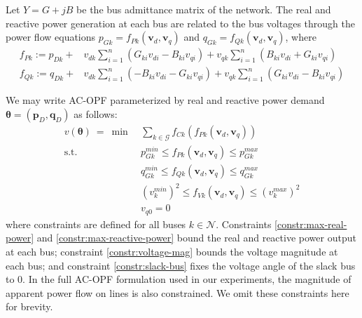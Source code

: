 \documentclass[10pt]{article} %
\theoremstyle{plain}
\theoremstyle{definition}
\theoremstyle{remark}
\begin{document}
Let $Y = G + j B$ be the bus admittance matrix of the network.
The real and reactive power generation at each bus are related to the bus voltages through the power flow equations $p_{Gk} = f_{Pk}(\mathbf{v}_d, \mathbf{v}_q)$ and $q_{Gk} = f_{Qk}(\mathbf{v}_d, \mathbf{v}_q)$, where
{
\setlength{\abovedisplayskip}{1pt}
\setlength{\belowdisplayskip}{3pt}
\setlength{\jot}{0pt}
\setlength{\arraycolsep}{3pt}
\begin{align}
    f_{Pk} :=  p_{Dk} + &v_{dk} \sum_{i=1}^{n}(G_{ki} v_{di} - B_{ki} v_{qi})
    + v_{qk} \sum_{i=1}^n (B_{ki} v_{di} + G_{ki} v_{qi}) \label{eq:active-power-flow}\\
    f_{Qk} := q_{Dk} + &v_{dk}\sum_{i=1}^{n}(-B_{ki} v_{di} - G_{ki} v_{qi})
    + v_{qk} \sum_{i=1}^n (G_{ki} v_{di} - B_{ki} v_{qi}) \label{eq:reactive-power-flow}
\end{align}
}

We may write AC-OPF parameterized by real and reactive power demand $\bm{\theta} = (\mathbf{p}_D, \mathbf{q}_D)$ as follows:
\begin{align}
    v(\bm{\theta}) ~= ~ \min~& \sum_{k \in \mathcal{G}} f_{Ck}(f_{Pk}(\mathbf{v}_d, \mathbf{v}_q))  \label{eq:AC-OPF} \\
    \text{s.t.}~& p_{Gk}^{min} \leq f_{Pk}(\mathbf{v}_d, \mathbf{v}_q) \leq p_{Gk}^{max} \label{constr:max-real-power} \\
    & q_{Gk}^{min} \leq f_{Qk}(\mathbf{v}_d, \mathbf{v}_q) \leq q_{Gk}^{max} \label{constr:max-reactive-power}\\
    & (v_{k}^{min})^2 \leq f_{Vk}(\mathbf{v}_d, \mathbf{v}_q) \leq (v_{k}^{max})^2 \label{constr:voltage-mag} \\
    & v_{q0} = 0 \label{constr:slack-bus}
\end{align}
where constraints are defined for all buses $k \in \mathcal{N}$. Constraints \cref{constr:max-real-power}{}{} and \cref{constr:max-reactive-power}{}{} bound the real and reactive power output at each bus; constraint \cref{constr:voltage-mag}{}{} bounds the voltage magnitude at each bus; and constraint \cref{constr:slack-bus}{}{} fixes the voltage angle of the slack bus to $0$. In the full AC-OPF formulation used in our experiments, the magnitude of apparent power flow on lines is also constrained. We omit these constraints here for brevity.
\end{document}
